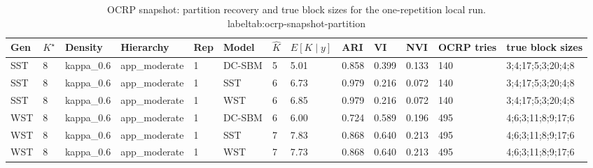 \begin{table}[!h]
\centering
\caption{OCRP snapshot: partition recovery and true block sizes for the one-repetition local run.\\label{tab:ocrp-snapshot-partition}}
\centering
\begin{tabular}[t]{lllllllllllll}
\toprule
Gen & $K^\star$ & Density & Hierarchy & Rep & Model & $\hat K$ & $E[K\mid y]$ & ARI & VI & NVI & OCRP tries & true block sizes\\
\midrule
SST & 8 & kappa_0.6 & app_moderate & 1 & DC-SBM & 5 & 5.01 & 0.858 & 0.399 & 0.133 & 140 & 3;4;17;5;3;20;4;8\\
SST & 8 & kappa_0.6 & app_moderate & 1 & SST & 6 & 6.73 & 0.979 & 0.216 & 0.072 & 140 & 3;4;17;5;3;20;4;8\\
SST & 8 & kappa_0.6 & app_moderate & 1 & WST & 6 & 6.85 & 0.979 & 0.216 & 0.072 & 140 & 3;4;17;5;3;20;4;8\\
WST & 8 & kappa_0.6 & app_moderate & 1 & DC-SBM & 6 & 6.00 & 0.724 & 0.589 & 0.196 & 495 & 4;6;3;11;8;9;17;6\\
WST & 8 & kappa_0.6 & app_moderate & 1 & SST & 7 & 7.83 & 0.868 & 0.640 & 0.213 & 495 & 4;6;3;11;8;9;17;6\\
WST & 8 & kappa_0.6 & app_moderate & 1 & WST & 7 & 7.73 & 0.868 & 0.640 & 0.213 & 495 & 4;6;3;11;8;9;17;6\\
\bottomrule
\end{tabular}
\end{table}
